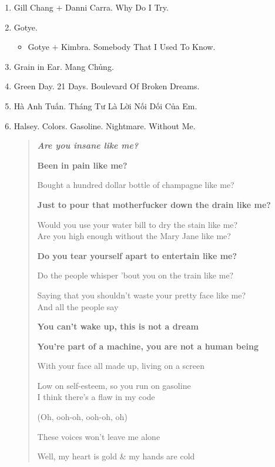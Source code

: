 \documentclass{article}
\begin{document}
\begin{enumerate}
	\item {\sc Gill Chang $+$ Danni Carra.} Why Do I Try.
	\item {\sc Gotye.}
	\begin{itemize}
		\item {\sc Gotye $+$ Kimbra.} Somebody That I Used To Know.
	\end{itemize}
	\item {\sc Grain in Ear.} Mang Chủng.
	\item {\sc Green Day.} 21 Days. Boulevard Of Broken Dreams.
	\item {\sc Hà Anh Tuấn.} Tháng Tư Là Lời Nối Dối Của Em.
	\item {\sc Halsey.} Colors. Gasoline. Nightmare. Without Me.
	
	\begin{quotation}\it
		\textbf{Are you insane like me?}
		
		\textbf{Been in pain like me?}
		
		Bought a hundred dollar bottle of champagne like me?
		
		\textbf{Just to pour that motherfucker down the drain like me?}
		
		Would you use your water bill to dry the stain like me?
		\\
		
		Are you high enough without the Mary Jane like me?
		
		\textbf{Do you tear yourself apart to entertain like me?}
		
		Do the people whisper 'bout you on the train like me?
		
		Saying that you shouldn't waste your pretty face like me?
		\\
		
		And all the people say
		
		\textbf{You can't wake up, this is not a dream}
		
		\textbf{You're part of a machine, you are not a human being}
		
		With your face all made up, living on a screen
		
		Low on self-esteem, so you run on gasoline
		\\
		
		I think there's a flaw in my code
		
		(Oh, ooh-oh, ooh-oh, oh)
		
		These voices won't leave me alone
		
		Well, my heart is gold \& my hands are cold
		\\
		

\end{quotation}
\end{enumerate}
\end{document}
